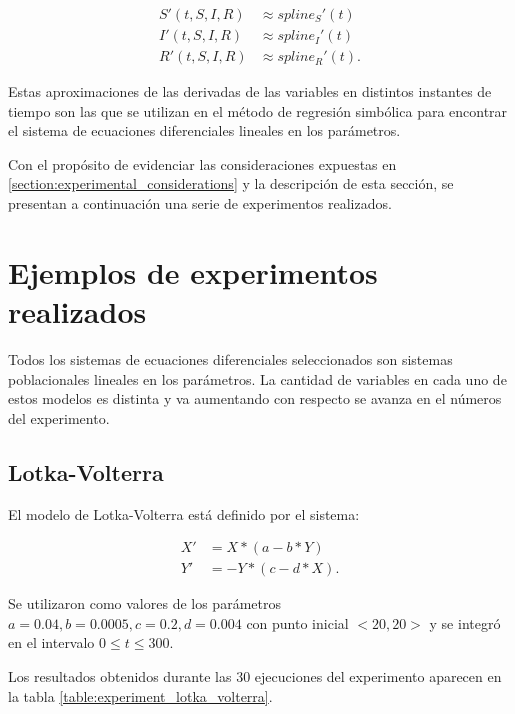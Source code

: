 \begin{align*}
    S'(t, S, I, R) & \approx spline_S'(t)  \\
    I'(t, S, I, R) & \approx spline_I'(t)  \\
    R'(t, S, I, R) & \approx spline_R'(t).
\end{align*}

Estas aproximaciones de las derivadas de las variables en distintos instantes de tiempo son las que se utilizan en el método de regresión simbólica para encontrar el sistema de ecuaciones diferenciales lineales en los parámetros.

Con el propósito de evidenciar las consideraciones expuestas en \ref{section:experimental_considerations} y la descripción de esta sección, se presentan a continuación una serie de experimentos realizados.

\section{Ejemplos de experimentos realizados}\label{section:experiments}

Todos los sistemas de ecuaciones diferenciales seleccionados son sistemas poblacionales lineales en los parámetros. La cantidad de variables en cada uno de estos modelos es distinta y va aumentando con respecto se avanza en el números del experimento.

\subsection{Lotka-Volterra}

El modelo de Lotka-Volterra está definido por el sistema:

\begin{align*}
    X' & = X * (a - b * Y)   \\
    Y' & = -Y * (c - d * X).
\end{align*}

Se utilizaron como valores de los parámetros $a = 0.04, b = 0.0005, c = 0.2, d = 0.004$ con punto inicial $<20, 20>$ y se integró en el intervalo $0 \leq t \leq 300$.

Los resultados obtenidos durante las 30 ejecuciones del experimento aparecen en la tabla \ref{table:experiment_lotka_volterra}.

